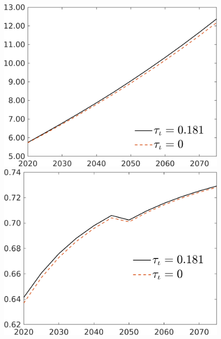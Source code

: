 \begin{figure}[h!!]
\begin{minipage}[]{0.32\textwidth}
\end{minipage}
\begin{minipage}[]{0.32\textwidth}
\includegraphics[width=1\textwidth]{../../codding_model/own_basedOnFried/optimalPol_010922_revision/figures/all_5Sept22/CompTaul_Reg7_An_spillover0_nsk0_xgr0_sep1_LFlimit1_emsbase0_countec0_GovRev1_etaa0.79_lgd1.png}
\end{minipage}
\begin{minipage}[]{0.32\textwidth}
\includegraphics[width=1\textwidth]{../../codding_model/own_basedOnFried/optimalPol_010922_revision/figures/all_5Sept22/CompTaul_Reg7_snS_spillover0_nsk0_xgr0_sep1_LFlimit1_emsbase0_countec0_GovRev1_etaa0.79_lgd1.png}
\end{minipage}
\end{figure}

